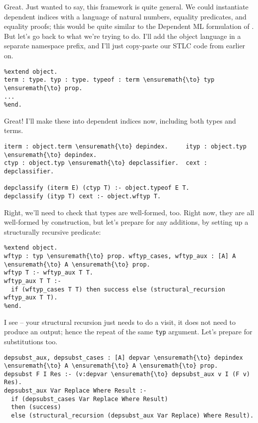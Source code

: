 \heroADVISOR{} Great. Just wanted to say, this framework is quite general. We
could instantiate dependent indices with a language of natural numbers,
equality predicates, and equality proofs; this would be quite similar to
the Dependent ML formulation of \citet{licata2005formulation}. But let's
go back to what we're trying to do. I'll add the object language in a
separate namespace prefix, and I'll just copy-paste our STLC code from
earlier on.

\begin{verbatim}
%extend object.
term : type. typ : type. typeof : term \ensuremath{\to} typ \ensuremath{\to} prop.
...
%end.
\end{verbatim}

\heroSTUDENT{} Great! I'll make these into dependent indices now, including
both types and terms.

\begin{verbatim}
iterm : object.term \ensuremath{\to} depindex.     ityp : object.typ \ensuremath{\to} depindex.
ctyp : object.typ \ensuremath{\to} depclassifier.  cext : depclassifier.

depclassify (iterm E) (ctyp T) :- object.typeof E T.
depclassify (ityp T) cext :- object.wftyp T.
\end{verbatim}

\heroADVISOR{} Right, we'll need to check that types are well-formed, too.
Right now, they are all well-formed by construction, but let's prepare
for any additions, by setting up a structurally recursive predicate:

\begin{verbatim}
%extend object.
wftyp : typ \ensuremath{\to} prop. wftyp_cases, wftyp_aux : [A] A \ensuremath{\to} A \ensuremath{\to} prop.
wftyp T :- wftyp_aux T T.
wftyp_aux T T :-
  if (wftyp_cases T T) then success else (structural_recursion wftyp_aux T T).
%end.
\end{verbatim}

\heroSTUDENT{} I see -- your structural recursion just needs to do a visit, it
does not need to produce an output; hence the repeat of the same
\texttt{typ} argument. Let's prepare for substitutions too.

\begin{verbatim}
depsubst_aux, depsubst_cases : [A] depvar \ensuremath{\to} depindex \ensuremath{\to} A \ensuremath{\to} A \ensuremath{\to} prop.
depsubst F I Res :- (v:depvar \ensuremath{\to} depsubst_aux v I (F v) Res).
depsubst_aux Var Replace Where Result :-
  if (depsubst_cases Var Replace Where Result)
  then (success)
  else (structural_recursion (depsubst_aux Var Replace) Where Result).
\end{verbatim}

